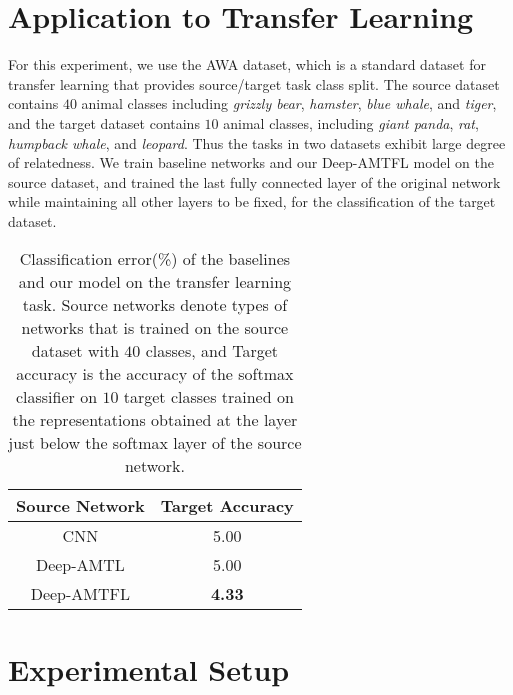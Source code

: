 \documentclass{article}
\begin{document}
\section{Application to Transfer Learning}	
For this experiment, we use the AWA dataset, which is a standard dataset for transfer learning that provides source/target task class split. The source dataset contains $40$ animal classes including \emph{grizzly bear}, \emph{hamster}, \emph{blue whale}, and \emph{tiger}, and the target dataset contains $10$ animal classes, including \emph{giant panda}, \emph{rat}, \emph{humpback whale}, and \emph{leopard}. Thus the tasks in two datasets exhibit large degree of relatedness. We train baseline networks and our Deep-AMTFL model on the source dataset, and trained the last fully connected layer of the original network while maintaining all other layers to be fixed, for the classification of the target dataset. 

\begin{table}[h]
	\small
	\vspace{-0.15in}
	\caption{\small Classification error(\%) of the baselines and our model on the transfer learning task. Source networks denote types of networks that is trained on the source dataset with $40$ classes, and Target accuracy is the accuracy of the softmax classifier on $10$ target classes trained on the representations obtained at the layer just below the softmax layer of the source network.}
	\label{awa_transfer}
	\begin{center}
		\begin{tabular}{c c}
			Source Network & Target Accuracy\\
			\hline
			\hline
			CNN & 5.00 \\
			Deep-AMTL & 5.00 \\
			\hline
			Deep-AMTFL & \bf 4.33 \\
		\end{tabular}
	\end{center}
	\vskip -0.1in
	\vspace{-0.15in}
\end{table}

\section{Experimental Setup}
\end{document}

